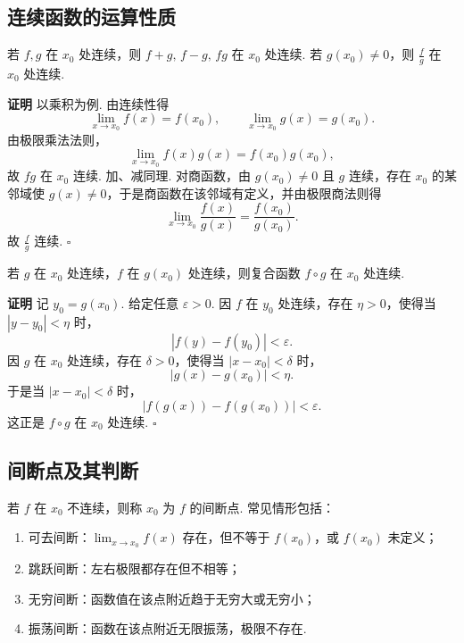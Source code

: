 \documentclass[fontset=fandol]{ctexart}
\newenvironment{proofdetail}{\par\noindent\textbf{证明}\quad}{\hfill$\square$\par\vspace{0.8em}}
\begin{document}
\subsection{连续函数的运算性质}

\begin{proposition}[四则运算]
若 $f,g$ 在 $x_0$ 处连续，则 $f+g,\,f-g,\,fg$ 在 $x_0$ 处连续. 若 $g(x_0)\neq0$，则 $\frac{f}{g}$ 在 $x_0$ 处连续.
\end{proposition}
\begin{proofdetail}
以乘积为例. 由连续性得
\[
\lim_{x\to x_0}f(x)=f(x_0),\qquad \lim_{x\to x_0}g(x)=g(x_0).
\]
由极限乘法法则，
\[
\lim_{x\to x_0}f(x)g(x)=f(x_0)g(x_0),
\]
故 $fg$ 在 $x_0$ 连续. 加、减同理. 对商函数，由 $g(x_0)\neq0$ 且 $g$ 连续，存在 $x_0$ 的某邻域使 $g(x)\neq0$，于是商函数在该邻域有定义，并由极限商法则得
\[
\lim_{x\to x_0}\frac{f(x)}{g(x)}=\frac{f(x_0)}{g(x_0)}.
\]
故 $\frac{f}{g}$ 连续.
\end{proofdetail}

\begin{proposition}[复合函数连续性]
若 $g$ 在 $x_0$ 处连续，$f$ 在 $g(x_0)$ 处连续，则复合函数 $f\circ g$ 在 $x_0$ 处连续.
\end{proposition}
\begin{proofdetail}
记 $y_0=g(x_0)$. 给定任意 $\varepsilon>0$. 因 $f$ 在 $y_0$ 处连续，存在 $\eta>0$，使得当 $|y-y_0|<\eta$ 时，
\[
|f(y)-f(y_0)|<\varepsilon.
\]
因 $g$ 在 $x_0$ 处连续，存在 $\delta>0$，使得当 $|x-x_0|<\delta$ 时，
\[
|g(x)-g(x_0)|<\eta.
\]
于是当 $|x-x_0|<\delta$ 时，
\[
|f(g(x))-f(g(x_0))|<\varepsilon.
\]
这正是 $f\circ g$ 在 $x_0$ 处连续.
\end{proofdetail}

\subsection{间断点及其判断}

\begin{definition}[间断点]
若 $f$ 在 $x_0$ 不连续，则称 $x_0$ 为 $f$ 的间断点. 常见情形包括：
\begin{enumerate}[label=(\arabic*),leftmargin=2em]
\item 可去间断：$\lim_{x\to x_0}f(x)$ 存在，但不等于 $f(x_0)$，或 $f(x_0)$ 未定义；
\item 跳跃间断：左右极限都存在但不相等；
\item 无穷间断：函数值在该点附近趋于无穷大或无穷小；
\item 振荡间断：函数在该点附近无限振荡，极限不存在.
\end{enumerate}
\end{definition}
\end{document}
